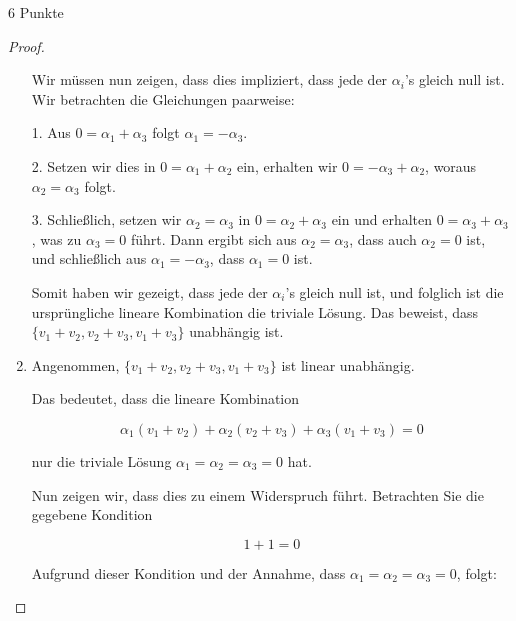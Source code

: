 \documentclass{problemset}
\begin{document}
\begin{problem}{6 Punkte}
\begin{proof}
\begin{enumerate}
              Wir müssen nun zeigen, dass dies impliziert, dass jede der
              \(\alpha_i\)'s gleich null ist. Wir betrachten die Gleichungen
              paarweise:

              1. Aus \(0 = \alpha_1 + \alpha_3\) folgt \(\alpha_1 = -\alpha_3\).

              2. Setzen wir dies in \(0 = \alpha_1 + \alpha_2\) ein, erhalten wir \(0 = -\alpha_3 + \alpha_2\), woraus \(\alpha_2 = \alpha_3\) folgt.

              3. Schließlich, setzen wir \(\alpha_2 = \alpha_3\) in \(0 = \alpha_2 + \alpha_3\) ein und erhalten \(0 = \alpha_3 + \alpha_3\), was zu \(\alpha_3 = 0\) führt. Dann ergibt sich aus \(\alpha_2 = \alpha_3\), dass auch \(\alpha_2 = 0\) ist, und schließlich aus \(\alpha_1 = -\alpha_3\), dass \(\alpha_1 = 0\) ist.

              Somit haben wir gezeigt, dass jede der \(\alpha_i\)'s gleich null
              ist, und folglich ist die ursprüngliche lineare Kombination die
              triviale Lösung. Das beweist, dass \(\{v_1+v_2, v_2+v_3,
              v_1+v_3\}\) unabhängig ist.
        \item Angenommen, $\{v_1+v_2, v_2+v_3, v_1+v_3\}$ ist linear
              unabhängig.

              Das bedeutet, dass die lineare Kombination

              \[
                  \alpha_1(v_1 + v_2) + \alpha_2(v_2 + v_3) + \alpha_3(v_1 + v_3) = 0
              \]

              nur die triviale Lösung $\alpha_1 = \alpha_2 = \alpha_3 = 0$ hat.

              Nun zeigen wir, dass dies zu einem Widerspruch führt. Betrachten
              Sie die gegebene Kondition

              \[
                  1 + 1 = 0
              \]

              Aufgrund dieser Kondition und der Annahme, dass $\alpha_1 =
              \alpha_2 = \alpha_3 = 0$, folgt:


\end{enumerate}
\end{proof}
\end{problem}
\end{document}
